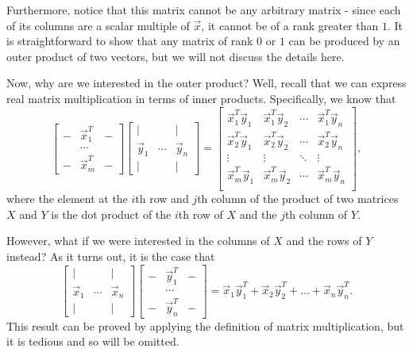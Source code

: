 \documentclass[letterpaper]{article}
\theoremstyle{remark}
\newcommand{\mat}[1]{\ensuremath{\begin{bmatrix}#1\end{bmatrix}}}
\begin{document}
Furthermore, notice that this matrix cannot be any arbitrary matrix - since each of its columns are a scalar multiple of $\vec{x}$, it cannot be of a rank greater than $1$. It is straightforward to show that any matrix of rank $0$ or $1$ can be produced by an outer product of two vectors, but we will not discuss the details here.

Now, why are we interested in the outer product? Well, recall that we can express real matrix multiplication in terms of inner products. Specifically, we know that
\[
    \mat{ - & \vec{x}_1^T & - \\  & \cdots &  \\  - & \vec{x}_m^T & -} \mat{| & & | \\ \vec{y}_1 & \cdots & \vec{y}_n \\ | & & |} = \mat{\vec{x}_1^T\vec{y}_1 & \vec{x}_1^T\vec{y}_2 & \cdots & \vec{x}_1^T\vec{y}_n \\
    \vec{x}_2^T\vec{y}_1 & \vec{x}_2^T\vec{y}_2 & \cdots & \vec{x}_2^T\vec{y}_n \\
    \vdots & \vdots & \ddots & \vdots \\
    \vec{x}_m^T\vec{y}_1 & \vec{x}_m^T\vec{y}_2 & \cdots & \vec{x}_m^T\vec{y}_n \\
    },
\]
where the element at the $i$th row and $j$th column of the product of two matrices $X$ and $Y$ is the dot product of the $i$th row of $X$ and the $j$th column of $Y$.

However, what if we were interested in the columns of $X$ and the rows of $Y$ instead? As it turns out, it is the case that
\[
    \mat{| & & | \\ \vec{x}_1 & \cdots & \vec{x}_n \\ | & & |} \mat{ - & \vec{y}_1^T & - \\  & \cdots &  \\  - & \vec{y}_n^T & -} = \vec{x}_1\vec{y}_1^T + \vec{x}_2\vec{y}_2^T + \ldots + \vec{x}_n\vec{y}_n^T.
\]
This result can be proved by applying the definition of matrix multiplication, but it is tedious and so will be omitted. 
\end{document}
